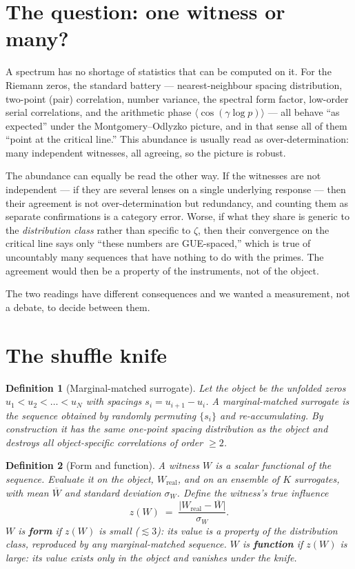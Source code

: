 \documentclass[11pt]{article}
\newtheorem{definition}{Definition}
\begin{document}
\section{The question: one witness or many?}

A spectrum has no shortage of statistics that can be computed on it. For the Riemann zeros, the standard battery --- nearest-neighbour spacing distribution, two-point (pair) correlation, number variance, the spectral form factor, low-order serial correlations, and the arithmetic phase $\langle\cos(\gamma\log p)\rangle$ --- all behave ``as expected'' under the Montgomery--Odlyzko picture, and in that sense all of them ``point at the critical line.'' This abundance is usually read as over-determination: many independent witnesses, all agreeing, so the picture is robust.

The abundance can equally be read the other way. If the witnesses are not independent --- if they are several lenses on a single underlying response --- then their agreement is not over-determination but redundancy, and counting them as separate confirmations is a category error. Worse, if what they share is generic to the \emph{distribution class} rather than specific to $\zeta$, then their convergence on the critical line says only ``these numbers are GUE-spaced,'' which is true of uncountably many sequences that have nothing to do with the primes. The agreement would then be a property of the instruments, not of the object.

The two readings have different consequences and we wanted a measurement, not a debate, to decide between them.

\section{The shuffle knife}\label{sec:knife}

\begin{definition}[Marginal-matched surrogate]
Let the object be the unfolded zeros $u_1<u_2<\dots<u_N$ with spacings $s_i=u_{i+1}-u_i$. A \emph{marginal-matched surrogate} is the sequence obtained by randomly permuting $\{s_i\}$ and re-accumulating. By construction it has the \emph{same} one-point spacing distribution as the object and destroys all object-specific correlations of order $\ge2$.
\end{definition}

\begin{definition}[Form and function]\label{def:ff}
A witness $W$ is a scalar functional of the sequence. Evaluate it on the object, $W_{\mathrm{real}}$, and on an ensemble of $K$ surrogates, with mean $\overline{W}$ and standard deviation $\sigma_W$. Define the witness's \emph{true influence}
\[
z(W)\;=\;\frac{\big|W_{\mathrm{real}}-\overline{W}\big|}{\sigma_W}.
\]
$W$ is \textbf{form} if $z(W)$ is small ($\lesssim3$): its value is a property of the distribution class, reproduced by any marginal-matched sequence. $W$ is \textbf{function} if $z(W)$ is large: its value exists only in the object and vanishes under the knife.
\end{definition}
\end{document}
